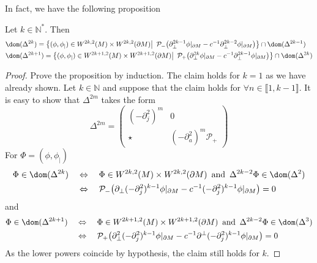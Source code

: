 In fact, we have the following proposition 
\begin{proposition}
Let $k \in \mathbb{N}^*$. Then
\begin{equation*}
\begin{split}
& \dom (\Delta^{2k} )  =
\big\{ (\phi, \phi_|)\in W^{2k,2}(M)\times W^{2k,2}(\partial M) \big\vert \enskip \mathcal{P}_-\big( \partial_\bot^{2k-1}\phi\vert_{\partial M} - c^{-1}\partial_\bot^{2k-2}\phi\vert_{\partial M}\big) \big\} 
\cap \dom(\Delta^{2k - 1})  \\
& \dom (\Delta^{2k+1} )  =
\big\{ (\phi, \phi_|)\in W^{2k+1,2}(M)\times W^{2k+1,2}(\partial M) \big\vert \enskip \mathcal{P}_+\big( \partial_\bot^{2k}\phi\vert_{\partial M} - c^{-1}\partial_\bot^{2k-1}\phi\vert_{\partial M}\big) \big\}  \cap \dom(\Delta^{2k })
\end{split}
\end{equation*}
\end{proposition}
\begin{proof}
Prove the proposition by induction.
The claim holds for $k =1$ as we have already shown. 
Let $k \in \mathbb{N}$ and suppose that the claim holds for $\forall n \in \llbracket 1, k-1 \rrbracket $. 
It is easy to show that $\Delta^{2m}$ takes the form
\begin{equation*}
 \Delta^{2m}  = 
\begin{pmatrix} (-\partial_j^2)^m & 0 \\
\star & (-\partial_a^2)^m\mathcal{P}_+ \end{pmatrix}
\end{equation*}
For $\Phi = (\phi, \phi_|)$
\begin{equation*}
\begin{split}
\Phi \in \dom(\Delta^{2k}) \quad &\Leftrightarrow \quad
\Phi \in W^{2k,2}(M)\times W^{2k,2}(\partial M) \enskip \mathrm{and}\enskip \Delta^{2k-2}\Phi \in \dom(\Delta^{2}) \\
&\Leftrightarrow \quad 
\mathcal{P}_{-}\big(\partial_\bot(-\partial_j^2)^{k-1}\phi\vert_{\partial M} - c^{-1}(-\partial_j^2)^{k-1}\phi\vert_{\partial M} \big) = 0
\end{split}
\end{equation*}
and
\begin{equation*}
\begin{split}
\Phi \in \dom(\Delta^{2k+1}) \quad &\Leftrightarrow \quad
\Phi \in W^{2k+1,2}(M)\times W^{2k+1,2}(\partial M) \enskip \mathrm{and}\enskip \Delta^{2k-2}\Phi \in \dom(\Delta^{3}) \\
&\Leftrightarrow \quad 
\mathcal{P}_{+}\big(\partial_\bot^2(-\partial_j^2)^{k-1}\phi\vert_{\partial M} - c^{-1}\partial^\bot(-\partial_j^2)^{k-1}\phi\vert_{\partial M} \big) = 0
\end{split}
\end{equation*}
As the lower powers coincide by hypothesis, 
the claim still holds for $k$.
\end{proof}
